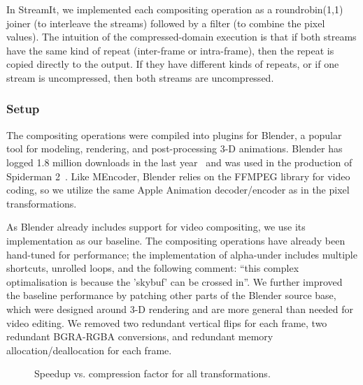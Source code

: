 In StreamIt, we implemented each compositing operation as a
roundrobin(1,1) joiner (to interleave the streams) followed by a
filter (to combine the pixel values).  The intuition of the
compressed-domain execution is that if both streams have the same kind
of repeat (inter-frame or intra-frame), then the repeat is copied
directly to the output.  If they have different kinds of repeats, or
if one stream is uncompressed, then both streams are uncompressed.

\subsubsection{Setup}

The compositing operations were compiled into plugins for Blender, a
popular tool for modeling, rendering, and post-processing 3-D
animations.  Blender has logged 1.8 million downloads in the last
year~\cite{blender-stats} and was used in the production of Spiderman
2~\cite{blender-wikipedia}.  Like MEncoder, Blender relies on the
FFMPEG library for video coding, so we utilize the same Apple
Animation decoder/encoder as in the pixel transformations.

As Blender already includes support for video compositing, we use its
implementation as our baseline.  The compositing operations have
already been hand-tuned for performance; the implementation of
alpha-under includes multiple shortcuts, unrolled loops, and the
following comment: ``this complex optimalisation is because the
'skybuf' can be crossed in''.  We further improved the baseline
performance by patching other parts of the Blender source base, which
were designed around 3-D rendering and are more general than needed
for video editing.  We removed two redundant vertical flips for each
frame, two redundant BGRA-RGBA conversions, and redundant memory
allocation/deallocation for each frame.

\begin{figure}[t]
\vspace{1.5pt}
\caption{Speedup vs. compression factor for all transformations.
\protect\label{fig:speedup-scatter}}
\vspace{-7.5pt}
\end{figure}

